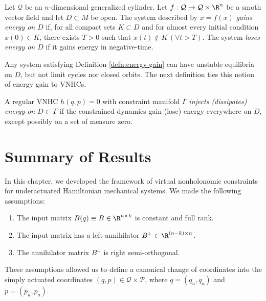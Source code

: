 \begin{defn}\label{defn:energy-gain}
    Let \(\mathcal{Q}\) be an
    \(n\)-dimensional generalized cylinder.
    Let \(f : \mathcal{Q} \rightarrow \mathcal{Q}\times\R^n\) be a smoth vector
    field and let \(D \subset M\) be open.
    The system described by \(\dot{x} = f(x)\) 
    \textit{gains energy on \(D\)} if, 
    for all compact sets \(K \subset D\) and for almost every initial
    condition \(x(0) \in K\), there exists \(T > 0\) such
    that \(x(t) \notin K \, (\forall t > T)\).
    The system \textit{loses energy on \(D\)} if it gains energy in
    negative-time.
\end{defn}

Any system satisfying Definition \ref{defn:energy-gain}
can have unstable equilibria on \(D\), but not limit cycles nor closed orbits.
The next definition ties this notion of energy gain to VNHCs.

\begin{defn}\label{defn:energy-injection}
    A regular VNHC \(h(q, p) = 0\) with constraint manifold \(\Gamma\)
    \textit{injects (dissipates) energy on \(D \subset \Gamma\)} if the
    constrained dynamics gain (lose) energy everywhere on \(D\), except possibly
    on a set of measure zero.
\end{defn}

\section{Summary of Results}
In this chapter, we developed the framework of virtual nonholonomic constraints
for underactuated Hamiltonian mechanical systems.
We made the following assumptions:
\begin{enumerate}
    \item The input matrix \(B(q) \equiv B \in \R^{n \times k}\) is constant and
        full rank.
    \item The input matrix has a left-annihilator 
        \(B^\perp \in \R^{(n-k)\times n}\). 
    \item The annihilator matrix \(B^\perp\) is right semi-orthogonal.
\end{enumerate}
These assumptions allowed us to define a canonical change of coordinates
into the simply actuated coordinates 
\((q,p) \in \mathcal{Q} \times \mathcal{P}\),
where \(q = (q_u,q_a)\) and \(p = (p_u,p_a)\).

